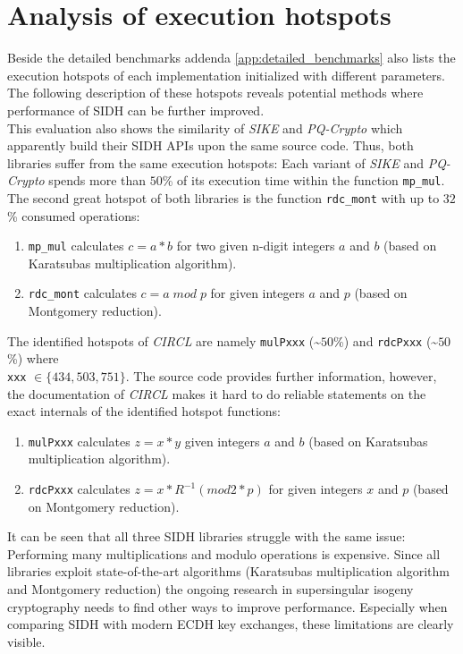 \section{Analysis of execution hotspots}
Beside the detailed benchmarks addenda \ref{app:detailed_benchmarks} also lists the execution hotspots of each implementation initialized with different parameters. The following description of these hotspots reveals potential methods where performance of SIDH can be further improved.\\
This evaluation also shows the similarity of \textit{SIKE} and \textit{PQ-Crypto} which apparently build their SIDH APIs upon the same source code. Thus, both libraries suffer from the same execution hotspots: Each variant of \textit{SIKE} and \textit{PQ-Crypto} spends more than $50$\% of its execution time within the function \texttt{mp\_mul}. The second great hotspot of both libraries is the function \texttt{rdc\_mont} with up to $32$\% consumed operations:
\begin{enumerate}
\item \texttt{mp\_mul} calculates $c=a*b$ for two given n-digit integers $a$ and $b$ (based on Karatsubas multiplication algorithm).
\item \texttt{rdc\_mont} calculates $c = a\;mod\;p$ for given integers $a$ and $p$ (based on Montgomery reduction).
\end{enumerate}
The identified hotspots of \textit{CIRCL} are namely \texttt{mulPxxx} (\textasciitilde $50$\%) and \texttt{rdcPxxx} (\textasciitilde $50$\%) where \\\texttt{xxx} $\in \{434, 503, 751\}$. The source code provides further information, however, the documentation of \textit{CIRCL} makes it hard to do reliable statements on the exact internals of the identified hotspot functions:
\begin{enumerate}
\item \texttt{mulPxxx} calculates $z=x*y$ given integers $a$ and $b$ (based on Karatsubas multiplication algorithm).
\item \texttt{rdcPxxx} calculates $z = x*R^{-1} (mod 2*p)$ for given integers $x$ and $p$ (based on Montgomery reduction).
\end{enumerate}
It can be seen that all three SIDH libraries struggle with the same issue: Performing many multiplications and modulo operations is expensive. Since all libraries exploit state-of-the-art algorithms (Karatsubas multiplication algorithm and Montgomery reduction) the ongoing research in supersingular isogeny cryptography needs to find other ways to improve performance. Especially when comparing SIDH with modern ECDH key exchanges, these limitations are clearly visible.

